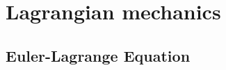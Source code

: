 \documentclass[a4paper,12pt]{report}
\begin{document}
\chapter{Lagrangian mechanics}
\section{Euler-Lagrange Equation}
\end{document}
